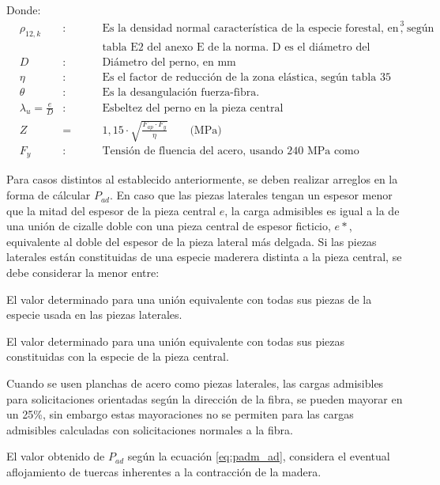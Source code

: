 Donde:
\begin{align*}
&\rho_{12,k} &: \qquad &\text{Es la densidad normal característica de la especie forestal, en kg/m}^3 \text{, según}\\
& & & \text{tabla E2 del anexo E de la norma. D es el diámetro del perno, en mm.}\\
&D &: \qquad &\text{Diámetro del perno, en mm}\\
&\eta &: \qquad &\text{Es el factor de reducción de la zona elástica, según tabla 35 de la norma.}\\
&\theta &: \qquad &\text{Es la desangulación fuerza-fibra.}\\
&\lambda_u = \frac{e}{D} &: \qquad &\text{Esbeltez del perno en la pieza central}\\
&Z &= \qquad &1,15\cdot \sqrt{\frac{F_{ap} \cdot F_y}{\eta}} \qquad \text{(MPa)}\\
&F_y &: \qquad &\text{Tensión de fluencia del acero, usando 240 MPa como referencia} 
\end{align*}

Para casos distintos al establecido anteriormente, se deben realizar arreglos en la forma de cálcular $P_{ad}$. En caso que las piezas laterales tengan un espesor menor que la mitad del espesor de la pieza central $e$, la carga admisibles es igual a la de una unión de cizalle doble con una pieza central de espesor ficticio, $e*$, equivalente al doble del espesor de la pieza lateral más delgada. Si las piezas laterales están constituidas de una especie maderera distinta a la pieza central, se debe considerar la menor entre:
\begin{itemize*}
	\item El valor determinado para una unión equivalente con todas sus piezas de la especie usada en las piezas laterales.
	\item El valor determinado para una unión equivalente con todas sus piezas constituidas con la especie de la pieza central.
\end{itemize*}

Cuando se usen planchas de acero como piezas laterales, las cargas admisibles para solicitaciones orientadas según la dirección de la fibra, se pueden mayorar en un 25\%, sin embargo estas mayoraciones no se permiten para las cargas admisibles calculadas con solicitaciones normales a la fibra.

El valor obtenido de $P_{ad}$ según la ecuación \ref{eq:padm_ad}, considera el eventual aflojamiento de tuercas inherentes a la contracción de la madera.

